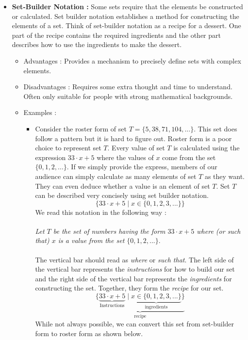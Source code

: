 \begin{itemize}
    \item \textbf{Set-Builder Notation : } Some sets require that the elements be constructed or calculated.  Set builder notation establishes a method for constructing the elements of a set. Think of set-builder notation as a recipe for a dessert.  One part of the recipe contains the required ingredients and the other part describes how to use the ingredients to make the dessert.   
        \begin{itemize}
            \item Advantages : Provides a mechanism to precisely define sets with complex elements.
            \item Disadvantages : Requires some extra thought and time to understand. Often only suitable for people with strong mathematical backgrounds.
            \item Examples :  
                \begin{itemize}
                    \item Consider the roster form of set $T = \{5,38,71,104,...\}$.  This set does follow a pattern but it is hard to figure out.  Roster form is a poor choice to represent set $T$.  Every value of set $T$ is calculated using the expression $33\cdot x +5$ where the values of $x$ come from the set $\{0,1,2,...\}$.  If we simply provide the express, members of our audience can simply calculate as many elements of set $T$ as they want.  They can even deduce whether a value is an element of set $T$.  Set $T$ can be described very concisely using set builder notation.
                    $$\{33 \cdot x + 5 \mid x \in \{0,1,2,3,...\}\}$$
                    We read this notation in the following way : \\\\\emph{Let $T$ be the set of numbers having the form $33 \cdot x + 5$ where (or such that) $x$ is a value from the set $\{0,1,2,...\}$}.\\\\The vertical bar should read as \emph{where} or \emph{such that}.  The left side of the vertical bar represents the \emph{instructions} for how to build our set and the right side of the vertical bar represents the \emph{ingredients} for constructing the set. Together, they form the \emph{recipe} for our set.
                    $$\underbrace{\{\underbrace{33 \cdot x + 5}_{\text{Instructions}} \mid \underbrace{x \in \{0,1,2,3,...\}}_{\text{ingredients}}\}}_{\text{recipe}}$$
                    While not always possible, we can convert this set from set-builder form to roster form as shown below.

\end{itemize}
\end{itemize}
\end{itemize}
